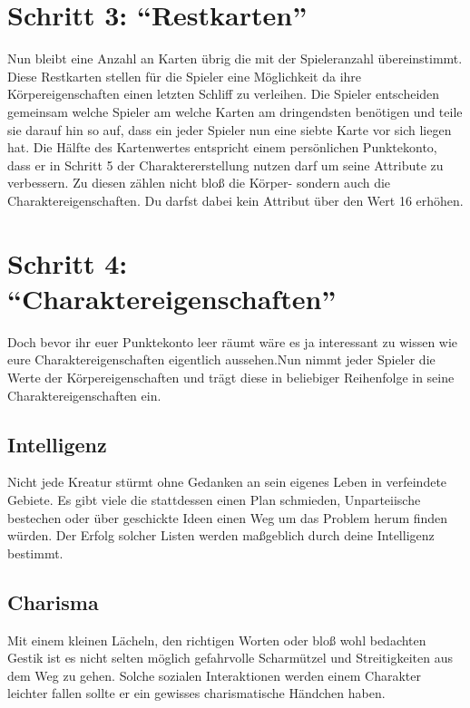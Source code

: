     \section{Schritt 3: “Restkarten”}
        Nun bleibt eine Anzahl an Karten übrig die mit der Spieleranzahl übereinstimmt. Diese Restkarten stellen für die Spieler eine Möglichkeit da ihre Körpereigenschaften einen letzten Schliff zu verleihen. Die Spieler entscheiden gemeinsam welche Spieler am welche Karten am dringendsten benötigen und teile sie darauf hin so auf, dass ein jeder Spieler nun eine siebte Karte vor sich liegen hat. Die Hälfte des Kartenwertes entspricht einem persönlichen Punktekonto, dass er in Schritt 5 der Charaktererstellung nutzen darf um seine Attribute zu verbessern. Zu diesen zählen nicht bloß die Körper- sondern auch die Charaktereigenschaften. Du darfst dabei kein Attribut über den Wert 16 erhöhen.

    

    \section{Schritt 4: “Charaktereigenschaften”}
        Doch bevor ihr euer Punktekonto leer räumt wäre es ja interessant zu wissen wie eure Charaktereigenschaften eigentlich aussehen.Nun nimmt jeder Spieler die Werte der Körpereigenschaften und trägt diese in beliebiger Reihenfolge in seine Charaktereigenschaften ein.
        
        \subsection*{Intelligenz}
            Nicht jede Kreatur stürmt ohne Gedanken an sein eigenes Leben in verfeindete Gebiete. Es gibt viele die stattdessen einen Plan schmieden, Unparteiische bestechen oder über geschickte Ideen einen Weg um das Problem herum finden würden. Der Erfolg solcher Listen werden maßgeblich durch deine Intelligenz bestimmt.
            
        \subsection*{Charisma}
            Mit einem kleinen Lächeln, den richtigen Worten oder bloß wohl bedachten Gestik ist es nicht selten möglich gefahrvolle Scharmützel und Streitigkeiten aus dem Weg zu gehen. Solche sozialen Interaktionen werden einem Charakter leichter fallen sollte er ein gewisses charismatische Händchen haben.
            
